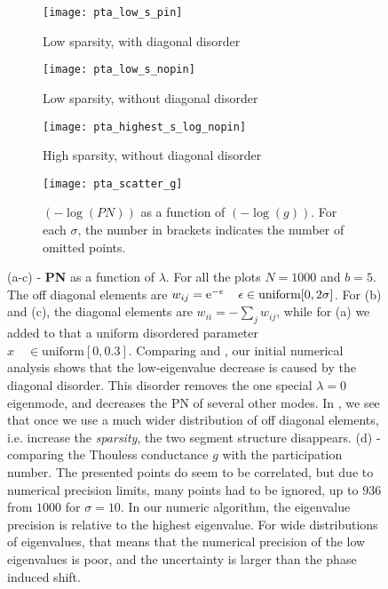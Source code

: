 \begin{figure}[H]
  \begin{subfigure}{.45\linewidth}
    \centering
    \texttt{[image: pta\_low\_s\_pin]}
    \caption{Low sparsity, with diagonal disorder}\label{fig:PN_kottos}
  \end{subfigure}     
  \begin{subfigure}{.45\linewidth}\centering
    \texttt{[image: pta\_low\_s\_nopin]}
    \caption{Low sparsity, without diagonal disorder}\label{fig:PN_kottos_nopin}
  \end{subfigure}
  \begin{subfigure}{.45\linewidth}\centering
     \texttt{[image: pta\_highest\_s\_log\_nopin]}
  \caption{High sparsity, without diagonal disorder}\label{fig:PN_kottos_sparse}
  \end{subfigure}
  \begin{subfigure}{.45\linewidth}\centering
     \texttt{[image: pta\_scatter\_g]}
  \caption{$(-\log(PN))$ as a function of $(-\log(g))$. 
  For each $\sigma$, the number in brackets indicates the number of omitted points.}\label{fig:PN_g_scatter}
  \end{subfigure}
  \caption{(a-c) - {\bf PN} as a function of $\lambda$.
  For all the plots $N=1000$ and $b=5$. 
  The off diagonal elements are 
  $w_{ij} = \mbox{e}^{-\epsilon} \quad \, \epsilon \in \textrm{uniform} [0,2\sigma]$.
  For (b) and (c), the diagonal elements are $w_{ii} = -\sum_j w_{ij}$, while for 
  (a) we added to that a uniform disordered parameter $x \quad \in \textrm{uniform} [0,0.3]$.
  Comparing  and , our initial numerical analysis 
  shows that the low-eigenvalue decrease
  is caused by the diagonal disorder. This disorder removes the one special 
  $\lambda=0$ eigenmode, and decreases the PN of several other modes.
  In , we see that once we use a much wider
distribution of off diagonal elements, i.e. increase the \emph{sparsity}, 
the two segment structure disappears.
  (d) - comparing the Thouless conductance $g$ with the participation number. 
  The presented points do seem to be correlated, but due to numerical precision limits,
  many points had to be ignored, up to $936$ from $1000$ for $\sigma=10$. In our numeric 
  algorithm, the eigenvalue precision is relative to the highest eigenvalue. For wide distributions
  of eigenvalues, that means that the numerical precision of the low eigenvalues is poor,
  and the uncertainty is larger than the phase induced shift.
  }
\end{figure}









